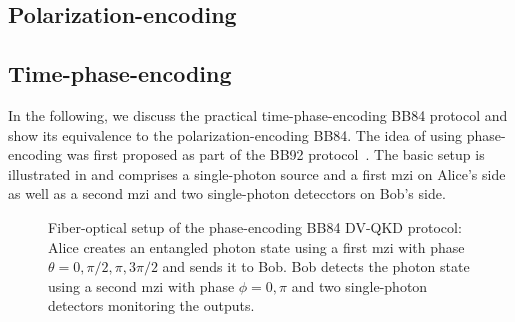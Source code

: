 \FloatBarrier
\subsection{Polarization-encoding}

\FloatBarrier
\subsection{Time-phase-encoding}

In the following, we discuss the practical time-phase-encoding BB84 protocol and show its equivalence to the polarization-encoding BB84.
The idea of using phase-encoding was first proposed as part of the BB92 protocol~\cite{Bennett1992}.
The basic setup is illustrated in  and comprises a single-photon source and a first \gls{mzi} on Alice's side as well as a second \gls{mzi} and two single-photon detecctors on Bob's side.
\begin{figure}[htb]
	\centering
	
	\caption{Fiber-optical setup of the phase-encoding BB84 DV-QKD protocol: Alice creates an entangled photon state using a first \gls{mzi} with phase $\theta=0,\pi/2,\pi,3\pi/2$ and sends it to Bob. Bob detects the photon state using a second \gls{mzi} with phase $\phi=0,\pi$ and two single-photon detectors monitoring the outputs.}\label{fig:time_phase_encoding_bb84}
\end{figure}

